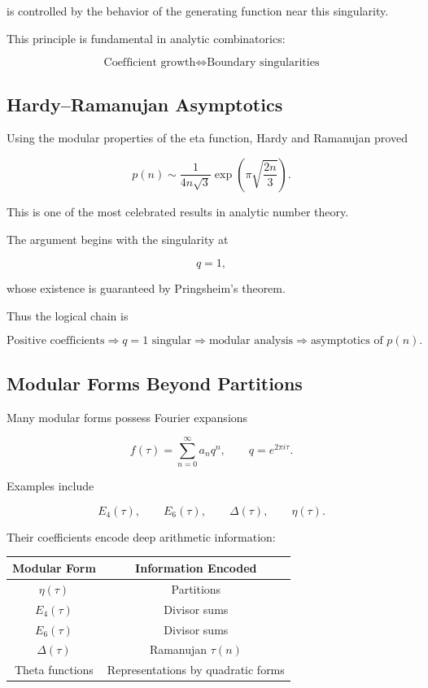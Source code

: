 \documentclass[12pt,a4paper]{article}
\theoremstyle{notespace}
\begin{document}
is controlled by the behavior of the generating function near this singularity.

This principle is fundamental in analytic combinatorics:

\[
\boxed{
	\text{Coefficient growth}
	\Longleftrightarrow
	\text{Boundary singularities}
}
\]

\bigskip

\subsection{Hardy--Ramanujan Asymptotics}

Using the modular properties of the eta function, Hardy and Ramanujan proved

\[
p(n)
\sim
\frac{1}
{4n\sqrt3}
\exp\!\left(
\pi
\sqrt{\frac{2n}{3}}
\right).
\]

This is one of the most celebrated results in analytic number theory.

The argument begins with the singularity at

\[
q=1,
\]

whose existence is guaranteed by Pringsheim's theorem.

\bigskip

Thus the logical chain is

\[
\text{Positive coefficients}
\Longrightarrow
q=1\text{ singular}
\Longrightarrow
\text{modular analysis}
\Longrightarrow
\text{asymptotics of }p(n).
\]

\bigskip

\subsection{Modular Forms Beyond Partitions}

Many modular forms possess Fourier expansions

\[
f(\tau)
=
\sum_{n=0}^{\infty}
a_n q^n,
\qquad
q=e^{2\pi i\tau}.
\]

Examples include

\[
E_4(\tau),
\qquad
E_6(\tau),
\qquad
\Delta(\tau),
\qquad
\eta(\tau).
\]

Their coefficients encode deep arithmetic information:

\begin{center}
	\renewcommand{\arraystretch}{1.3}
	\begin{tabular}{|c|c|}
		\hline
		Modular Form & Information Encoded \\
		\hline
		\(\eta(\tau)\) & Partitions \\
		\hline
		\(E_4(\tau)\) & Divisor sums \\
		\hline
		\(E_6(\tau)\) & Divisor sums \\
		\hline
		\(\Delta(\tau)\) & Ramanujan \(\tau(n)\) \\
		\hline
		Theta functions & Representations by quadratic forms \\
		\hline
	\end{tabular}
\end{center}
\end{document}
